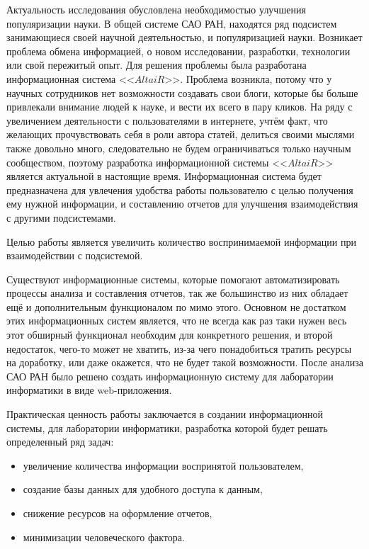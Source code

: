 Актуальность исследования обусловлена необходимостью улучшения популяризации науки. В общей системе САО РАН, находятся ряд подсистем занимающиеся своей научной деятельностью, и популяризацией науки. Возникает проблема обмена информацией, о новом исследовании, разработки, технологии или свой пережитый опыт. Для решения проблемы была разработана информационная система <<$AltaiR$>>. Проблема возникла, потому что у научных сотрудников нет возможности создавать свои блоги, которые бы больше привлекали внимание людей к науке, и вести их всего в пару кликов. На ряду с увеличением деятельности с пользователями в интернете, учтём факт, что желающих прочувствовать себя в роли автора статей, делиться своими мыслями также довольно много, следовательно не будем ограничиваться только научным сообществом, поэтому разработка информационной системы <<$AltaiR$>> является актуальной в настоящие время.
Информационная система будет предназначена для увлечения удобства работы пользователю с целью получения ему нужной информации, и составлению отчетов для улучшения взаимодействия с другими подсистемами.

Целью работы является увеличить количество воспринимаемой информации при взаимодействии с подсистемой. 

Существуют информационные системы, которые помогают автоматизировать процессы анализа и составления отчетов, так же большинство из них обладает ещё и дополнительным функционалом по мимо этого. Основном не достатком этих информационных систем является, что не всегда как раз таки нужен весь этот обширный функционал необходим для конкретного решения, и второй недостаток, чего-то может не хватить, из-за чего понадобиться тратить ресурсы на доработку, или даже окажется, что не будет такой возможности. После анализа САО РАН было решено создать информационную систему для лаборатории информатики в виде web-приложения.

Практическая ценность работы заключается в создании информационной системы, для лаборатории информатики, разработка которой будет решать определенный ряд задач:
\begin{itemize}
	\item увеличение количества информации воспринятой пользователем,
	\item создание базы данных для удобного доступа к данным,
	\item снижение ресурсов на оформление отчетов,
	\item минимизации человеческого фактора.
\end{itemize}


